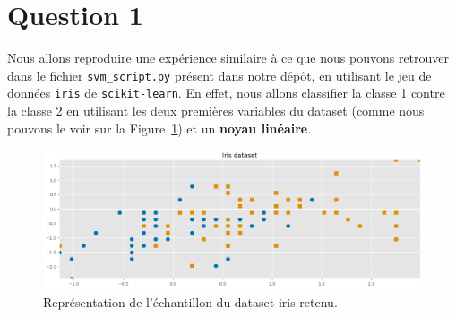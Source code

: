 \documentclass{article}
\begin{document}
\section{Question 1}

Nous allons reproduire une expérience similaire à ce que nous pouvons retrouver dans le fichier \texttt{svm\_script.py} présent dans notre dépôt, en utilisant le jeu de données \texttt{iris} de \texttt{scikit-learn}. En effet, nous allons classifier la classe 1 contre la classe 2 en utilisant les deux premières variables du dataset (comme nous pouvons le voir sur la Figure~\ref{fig:iris_dataset}) et un \textbf{noyau linéaire}.

\begin{figure}[H]
    \centering
    \includegraphics[width=\linewidth]{outputs/q1_dataset.png}
    \caption{Représentation de l'échantillon du dataset iris retenu.}
    \label{fig:iris_dataset}
\end{figure}
\end{document}
